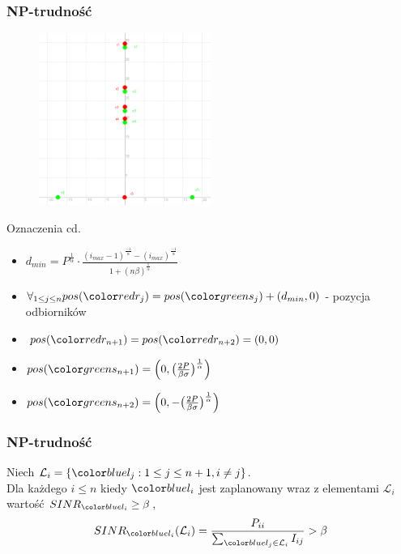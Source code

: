 \documentclass[polish, t,10pt]{beamer}
\begin{document}
\begin{frame}
    \frametitle{NP-trudność}
    \begin{figure}
        \includegraphics[width=0.5\textwidth]{pictures/np-placement2.png}
    \end{figure}
    \begin{block}{Oznaczenia cd.}
        \begin{itemize}
            \item $d_{min} = P^\frac{1}{\alpha}\cdot\frac{(i_{max}-1)^\frac{-1}{\alpha}-(i_{max})^\frac{-1}{\alpha}}{1+(n\beta)^\frac{1}{\alpha}}$
            \item $\forall_{1 \leq j \leq n} pos(\rj) = pos(\sj) + (d_{min}, 0)$ - pozycja odbiorników
            \item $pos(\rno) = pos(\rnt) = (0, 0)$
            \item $pos(\sno) = \Big(0, \big(\frac{2P}{\beta\sigma}\big)^\frac{1}{\alpha}\Big)$
            \item $pos(\snt) = \Big(0, -\big(\frac{2P}{\beta\sigma}\big)^\frac{1}{\alpha}\Big)$
        \end{itemize}
    \end{block}
\end{frame}
\begin{frame}
    \frametitle{NP-trudność}
    \begin{lemma}
        Niech $\mathcal{L}_i = \{\lj: 1 \leq j \leq n + 1, i \neq j\}$.\\
        Dla każdego $i \leq n$ kiedy $\li$ jest zaplanowany wraz z elementami $\mathcal{L}_i$ wartość $SINR_\li \ge \beta$,
        $$
            SINR_\li(\mathcal{L}_i) = \frac{P_{ii}}{\sum_{\lj \in \mathcal{L}_i} I_{ij}} > \beta
        $$
    \end{lemma}
\end{frame}
\end{document}

